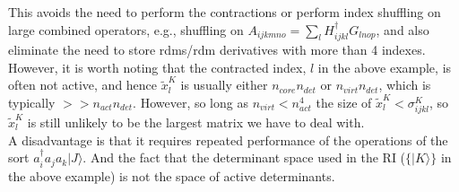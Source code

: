 \documentclass[12pt]{article}
\begin{document}
\noindent This avoids the need to perform the contractions or perform index
shuffling on large combined operators, e.g., shuffling on  $A_{ijkmno} =
\sum_{l} H^{\dagger}_{ijkl}G_{lnop}$, and also eliminate the need to store
rdms/rdm derivatives with more than 4 indexes. However, it is
worth noting that the contracted index, $l$ in the above example, is often not
active, and hence $\tilde{x}_{l}^{K}$ is usually either $n_{core}n_{det}$ or
$n_{virt}n_{det}$, which is typically $ >> n_{act}n_{det}$. However, so long as
$n_{virt} < n_{act}^{4} $ the size of    $\tilde{x}_{l}^{K} < \sigma_{ijkl}^{K} $,
so $\tilde{x}_{l}^{K}$ is still unlikely to be the largest matrix we have to deal with.
\\

\noindent A disadvantage is that it requires repeated performance of the
operations of the sort $a^{\dagger}_{i}a_{j}a_{k}|J\rangle$.  And the fact that
the determinant space used in the RI ($\{|K\rangle\}$ in the above example) is not the space
of active determinants. 
\end{document}
